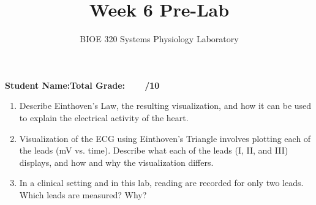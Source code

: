 \documentclass{article}
\title{Week 6 Pre-Lab}
\author{BIOE 320 Systems Physiology Laboratory}
\date{}
\begin{document}
\maketitle
\large

\textbf{Student Name:}\hfill 	\textbf{Total Grade:\ \ \ \ /10}\vspace{0.5cm}

\begin{enumerate}
	\item Describe Einthoven's Law, the resulting visualization, and how it can be used to explain the electrical activity of the heart.
	\item Visualization of the ECG using Einthoven's Triangle involves plotting each of the leads (mV vs. time). Describe what each of the leads (I, II, and III) displays, and how and why the visualization differs.
	\item In a clinical setting and in this lab, reading are recorded for only two leads. Which leads are measured? Why?
\end{enumerate}
\end{document}
